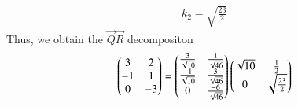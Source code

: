 \begin{enumerate}[label=\thesubsection.\arabic*.,ref=\thesubsection.\theenumi]
\begin{align}
\\
k_2 = \sqrt{\frac{23}{2}}
\end{align}
Thus, we obtain the $\vec{Q}\vec{R}$ decompositon
\begin{align}
\begin{pmatrix}
3 & 2
\\
-1 & 1
\\
0 & -3
\end{pmatrix}
=\begin{pmatrix}
\frac{3}{\sqrt{10}} & \frac{1}{\sqrt{46}}
\\
\frac{-1}{\sqrt{10}} & \frac{3}{\sqrt{46}}
\\
0 & \frac{-6}{\sqrt{46}}
\end{pmatrix}
\begin{pmatrix}
\sqrt{10}& \frac{1}{2}
\\
0&\sqrt{\frac{23}{2}}
\end{pmatrix}
\end{align}

\end{enumerate}
